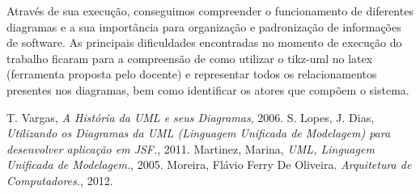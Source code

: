 \documentclass[a4paper,12pt]{article}
\begin{document}
Através de sua execução, conseguimos compreender o funcionamento de diferentes diagramas e a sua importância para organização e padronização de informações de software. As principais dificuldades encontradas no momento de execução do trabalho ficaram para a compreensão de como utilizar o tikz-uml no latex (ferramenta proposta pelo docente) e representar todos os relacionamentos presentes nos diagramas, bem como identificar os atores que compõem o sistema.

\newpage

\begin{thebibliography}{1}
  T. Vargas,
  \emph{A História da UML e seus Diagramas},
  2006.
  S. Lopes,
  J. Dias,
  \emph{Utilizando os Diagramas da UML (Linguagem Unificada de Modelagem) para desenvolver aplicação em JSF.},
  2011.
  Martinez,
  Marina,
  \emph{UML, Linguagem Unificada de Modelagem.},
  2005.
  Moreira, Flávio Ferry De Oliveira.
  \emph{Arquitetura de Computadores.},
  2012.
\end{thebibliography}
\end{document}
